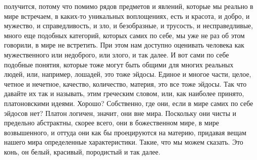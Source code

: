 получится, потому что помимо рядов предметов и явлений, которые мы реально в
мире встречаем, в каких-то уникальных воплощениях, есть и красота, и добро, и
мужество, и справедливость, и зло, и безобразные, и трусость, и несправедливые,
много еще подобных категорий, которых самих по себе, мы уже не раз об этом
говорили, в мире не встретить. При этом нам доступно оценивать человека как
мужественного или недоброго, или злого, и так далее. И вот сами по себе подобные
понятия, которые тоже могут быть общими для многих реальных людей, или,
например, лошадей, это тоже эйдосы. Единое и многое части, целое, четное и
нечетное, качество, количество, материя, это все тоже эйдосы. Так что давайте их
так и называть, этим греческим словом, или, как наиболее принято, платоновскими
идеями. Хорошо? Собственно, где они, если в мире самих по себе эйдосов нет?
Платон логичен, значит, они вне мира. Поскольку они чисты и предельно
абстрактны, скорее всего, они в божественном мире, в мире возвышенного, и оттуда
они как бы проецируются на материю, придавая вещам нашего мира определенные
характеристики. Такие, что мы можем сказать. Это конь, он белый, красивый,
породистый и так далее. 


